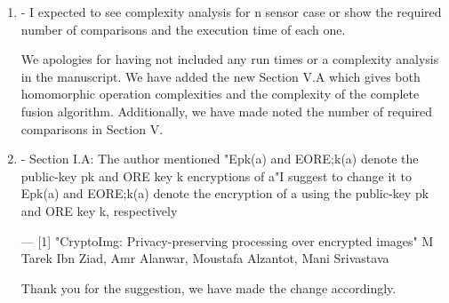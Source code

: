 \documentclass[a4paper]{scrartcl}
\newenvironment{rebuttal}{\begin{enumerate}[label={\color{grey}\thesection.\arabic{enumi}},leftmargin=0pt,ref=\thesection.\arabic{enumi}]}{\end{enumerate}}
\newcommand{\reviewtext}[1]{{\color{nblue} #1}}
\begin{document}
\begin{rebuttal}
\item \reviewtext{- I expected to see complexity analysis for n sensor case or show the
required number of comparisons and the execution time of each one. }

We apologies for having not included any run times or a complexity analysis in the manuscript. We have added the new Section V.A which gives both homomorphic operation complexities and the complexity of the complete fusion algorithm. Additionally, we have made noted the number of required comparisons in Section V.

\item \reviewtext{- Section I.A: The author mentioned 
"Epk(a) and EORE;k(a) denote the public-key pk and ORE key k
encryptions of a"I suggest to change it to 
Epk(a) and EORE;k(a) denote the encryption of a using the public-key pk
and ORE key k, respectively

---
[1] "CryptoImg: Privacy-preserving processing over encrypted images" M
Tarek Ibn Ziad, Amr Alanwar, Moustafa Alzantot, Mani Srivastava}

Thank you for the suggestion, we have made the change accordingly.

\end{rebuttal}

\end{document}
